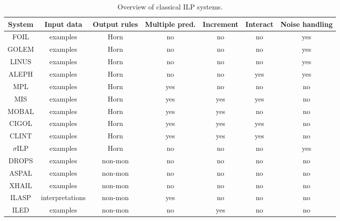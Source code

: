 \begin{table}[t]
\centering
\begin{tabular}{|c|c|c|c|c|c|c|}
\hline
System & Input data&Output rules & Multiple pred. &Increment & Interact &Noise handling\\
\hline
FOIL \cite{foil} & examples&Horn& no &no & no  &yes \\
GOLEM \cite{golem} &examples&Horn&  no &no & no & yes \\
LINUS \cite{linus} &examples&Horn&  no& no & no & yes \\
ALEPH \cite{aleph} &examples&Horn&  no &no & yes & yes \\
MPL \cite{mpl} &examples&Horn&  yes &no & no & no \\
MIS \cite{mis} &examples&Horn&  yes &yes & yes & no \\
MOBAL \cite{mobal} &examples&Horn&  yes &yes & no & no \\
CIGOL \cite{cigol} &examples&Horn&  yes &yes & yes & no \\
CLINT \cite{clint} &examples&Horn&  yes &yes & yes & no \\
$\sigma$ILP \cite{sigmailp}&examples&Horn&no&no&no&yes\\
DROPS \cite{CorapiRL10}&examples&non-mon&no&no&no&no\\
ASPAL \cite{ASPAL}&examples&non-mon&no&no&no&no\\
XHAIL \cite{XHAIL}&examples&non-mon&no&no&no&no\\
ILASP \cite{ILASP_system}&interpretations&non-mon&yes&no&no&no\\
ILED \cite{ILED}&examples&non-mon&no&yes&no&no\\

\hline
\end{tabular}
\caption{Overview of classical ILP systems.}
\label{tab:ilp}
\end{table}